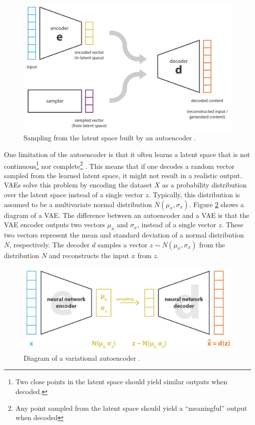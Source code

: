 \begin{figure}[!h]
 \centering
 \includegraphics[width=0.8\columnwidth]{imgs/background/ae_sampling.png}
 \caption{Sampling from the latent space built by an autoencoder \cite{rocca2019understanding}.}
 \label{fig:ae_sampling}
\end{figure}

One limitation of the autoencoder is that it often learns a latent space that is not continuous\footnote{Two close points in the latent space should yield similar outputs when decoded.} nor complete\footnote{Any point sampled from the latent space should yield a ``meaningful'' output when decoded} \cite{roberts2018hierarchical}. This means that if one decodes a random vector sampled from the learned latent space, it might not result in a realistic output. VAEs solve this problem by encoding the dataset $X$ as a probability distribution over the latent space instead of a single vector $z$. Typically, this distribution is assumed to be a multivariate normal distribution $N(\mu_x, \sigma_x)$. Figure \ref{fig:vae} shows a diagram of a VAE. The difference between an autoencoder and a VAE is that the VAE encoder outputs two vectors $\mu_x$ and $\sigma_x$, instead of a single vector $z$. These two vectors represent the mean and standard deviation of a normal distribution $N$, respectively. The decoder $d$ samples a vector $z \sim N(\mu_x, \sigma_x)$ from the distribution $N$ and reconstructs the input $x$ from $z$.

\begin{figure}[!h]
 \centering
 \includegraphics[width=0.8\columnwidth]{imgs/background/vae.png}
 \caption{Diagram of a variational autoencoder \cite{rocca2019understanding}.}
 \label{fig:vae}
\end{figure}

